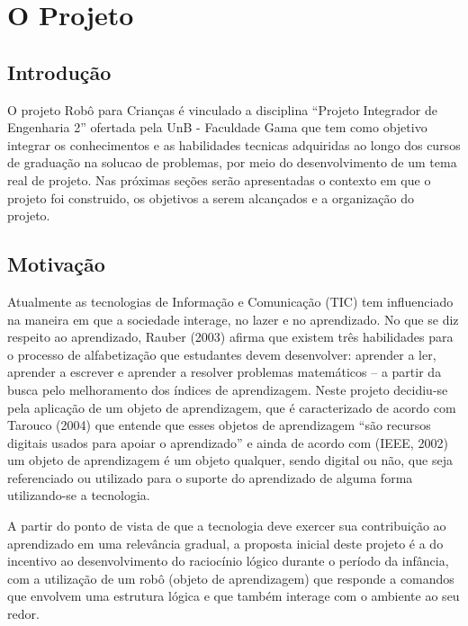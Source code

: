 \chapter[O Projeto]{O Projeto}

\section{Introdução}
O projeto Robô para Crianças é vinculado a disciplina “Projeto Integrador de Engenharia 2” ofertada pela UnB - Faculdade Gama que tem como objetivo integrar os conhecimentos e as habilidades tecnicas adquiridas ao longo dos cursos de graduação na solucao de problemas, por meio do desenvolvimento de um tema real de projeto. Nas próximas seções serão apresentadas o contexto em que o projeto foi construido, os objetivos a serem alcançados e a organização do projeto.

\section{Motivação}
Atualmente as tecnologias de Informação e Comunicação (TIC) tem influenciado na maneira em que a sociedade interage, no lazer e no aprendizado. No que se diz respeito ao aprendizado, Rauber (2003) afirma que existem três habilidades para o processo de alfabetização que estudantes devem desenvolver: aprender a ler, aprender a escrever e aprender a resolver problemas matemáticos – a partir da busca pelo melhoramento dos índices de aprendizagem. Neste projeto decidiu-se pela aplicação de um objeto de aprendizagem, que é caracterizado de acordo com Tarouco (2004) que entende que esses objetos de aprendizagem “são recursos digitais usados para apoiar o aprendizado” e ainda de acordo com (IEEE, 2002) um objeto de aprendizagem é um objeto qualquer, sendo digital ou não, que seja referenciado ou utilizado para o suporte do aprendizado de alguma forma utilizando-se a tecnologia.

A partir do ponto de vista de que a tecnologia deve exercer sua contribuição ao aprendizado em uma relevância gradual, a proposta inicial deste projeto é a do incentivo ao desenvolvimento do raciocínio lógico durante o período da infância, com a utilização de um robô (objeto de aprendizagem) que responde a comandos que envolvem uma estrutura lógica e que também interage com o ambiente ao seu redor.

